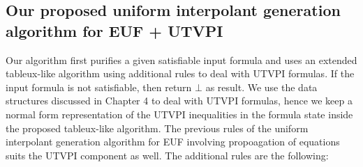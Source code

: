 \subsection{Our proposed uniform interpolant generation algorithm for EUF + UTVPI}

Our algorithm first purifies a given satisfiable input formula and 
uses an extended tableux-like algorithm
using additional rules to deal with UTVPI formulas. 
If the input formula is not satisfiable, 
then return $\bot$ as result. 
We use the data structures discussed in Chapter 4 to deal with UTVPI formulas,
hence we keep a normal form representation of the UTVPI inequalities in the
formula state inside the proposed tableux-like algorithm.
The previous rules of the uniform interpolant generation algorithm
for EUF involving propoagation of equations suits the UTVPI component as well. 
The additional rules are the following:

